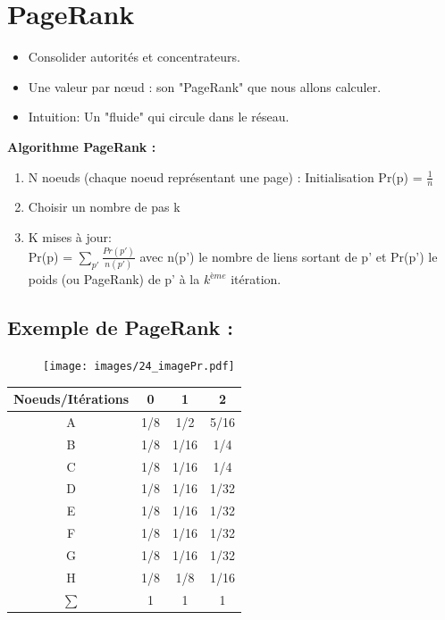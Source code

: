 \section{PageRank}
\begin{itemize}
	\item Consolider autorités et concentrateurs.
	\item Une valeur par nœud : son "PageRank" que nous allons calculer. 
	\item Intuition: Un "fluide" qui circule dans le réseau. 
\end{itemize}

\textbf{ Algorithme PageRank :}
\begin{enumerate}
	\item N noeuds (chaque noeud représentant une page) :
	Initialisation Pr(p) =  $\frac{1}{n}$
	\item Choisir un nombre de pas k
	\item K mises à jour:\\
	Pr(p) = $ \sum_ {p'}\frac{Pr(p')}{n(p')} $ avec n(p') le nombre de liens sortant de p' et Pr(p') le poids (ou PageRank) de p' à la $k^{ème}$ itération.
\end{enumerate}
\subsection*{Exemple de PageRank :}

\begin{figure}[!ht]
\centering
 \texttt{[image: images/24\_imagePr.pdf]}
\label{graphPageRank}
\end{figure}

 
 	\begin{tabular}{|c| c |c |c |}
		\hline
		Noeuds/Itérations & 0 & 1 & 2 \\
		\hline
		A & 1/8 & 1/2 & 5/16 \\
		B & 1/8 & 1/16 &  1/4   \\
		C & 1/8 & 1/16 & 1/4    \\
		D & 1/8 & 1/16 & 1/32  \\
		E & 1/8 & 1/16 &  1/32   \\
		F & 1/8 & 1/16 & 1/32    \\
		G & 1/8 & 1/16 & 1/32    \\
		H & 1/8 & 1/8 &  1/16   \\
		\hline
		$\sum $ & 1 & 1 & 1 \\
		\hline
	\end{tabular}


